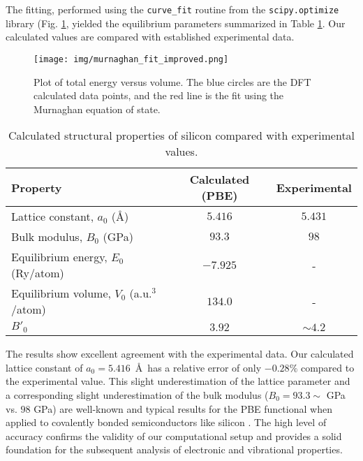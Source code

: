 \documentclass{article}
\begin{document}
The fitting, performed using the \verb|curve_fit| routine from the \verb|scipy.optimize| library (Fig. \ref{fig:murn}, yielded the equilibrium parameters summarized in Table \ref{tab:eos_results}. Our calculated values are compared with established experimental data.

\begin{figure}[h!]
    \centering
    \texttt{[image: img/murnaghan\_fit\_improved.png]}
    \caption{Plot of total energy versus volume. The blue circles are the DFT calculated data points, and the red line is the fit using the Murnaghan equation of state.}
    \label{fig:murn}
\end{figure}

\begin{table}[h!]
    \centering
    \caption{Calculated structural properties of silicon compared with experimental values.}
    \label{tab:eos_results}
    \begin{tabular}{l c c}
        \hline\hline
        \textbf{Property} & \textbf{Calculated (PBE)} & \textbf{Experimental} \\
        \hline
        Lattice constant, $a_0$ (\AA) & $5.416$ & $5.431$ \cite{okada1984} \\
        Bulk modulus, $B_0$ (GPa) & $93.3$ & $98$ \cite{Junquera2001} \\
        Equilibrium energy, $E_0$ (Ry/atom) & $-7.925$ & - \\
        Equilibrium volume, $V_0$ (a.u.$^3$/atom) & $134.0$ & - \\
        $B'_0$ & $3.92$ & $\sim 4.2$ \cite{Junquera2001} \\
        \hline\hline
    \end{tabular}
\end{table}

The results show excellent agreement with the experimental data. Our calculated lattice constant of $a_0 = 5.416$~\AA\ has a relative error of only $-0.28\%$ compared to the experimental value. This slight underestimation of the lattice parameter and a corresponding slight underestimation of the bulk modulus ($B_0 = 93.3\sim$ GPa vs. $98$ GPa) are well-known and typical results for the PBE functional when applied to covalently bonded semiconductors like silicon \cite{haas2009}. The high level of accuracy confirms the validity of our computational setup and provides a solid foundation for the subsequent analysis of electronic and vibrational properties.

\end{document}
